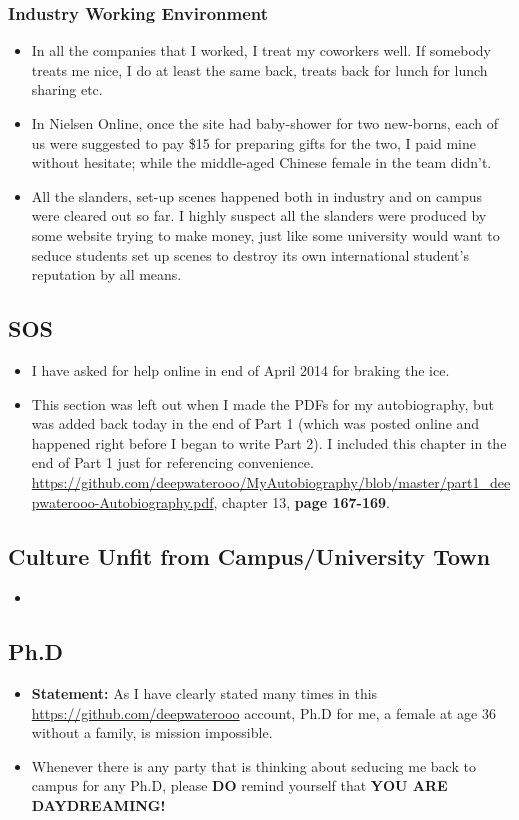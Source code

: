 \documentclass[9pt,b5paper]{article}
\begin{document}
\subsubsection{Industry Working Environment}
\label{sec-12-1-3}
\begin{itemize}
\item In all the companies that I worked, I treat my coworkers well. If somebody treats me nice, I do at least the same back, treats back for lunch for lunch sharing etc.
\item In Nielsen Online, once the site had baby-shower for two new-borns, each of us were suggested to pay \$15 for preparing gifts for the two, I paid mine without hesitate; while the middle-aged Chinese female in the team didn't.
\item All the slanders, set-up scenes happened both in industry and on campus were cleared out so far. I highly suspect all the slanders were produced by some website trying to make money, just like some university would want to seduce students set up scenes to destroy its own international student's reputation by all means.
\end{itemize}
\subsection{SOS}
\label{sec-12-2}
\begin{itemize}
\item I have asked for help online in end of April 2014 for braking the ice.
\item This section was left out when I made the PDFs for my autobiography, but was added back today in the end of Part 1 (which was posted online and happened right before I began to write Part 2). I included this chapter in the end of Part 1 just for referencing convenience. \url{https://github.com/deepwaterooo/MyAutobiography/blob/master/part1_deepwaterooo-Autobiography.pdf}, chapter 13, \textbf{page 167-169}.
\end{itemize}
\subsection{Culture Unfit from Campus/University Town}
\label{sec-12-3}
\begin{itemize}
\item 
\end{itemize}
\subsection{Ph.D}
\label{sec-12-4}
\begin{itemize}
\item \textbf{Statement:} As I have clearly stated many times in this \url{https://github.com/deepwaterooo} account, Ph.D for me, a female at age 36 without a family, is mission impossible.
\item Whenever there is any party that is thinking about seducing me back to campus for any Ph.D, please \textbf{DO} remind yourself that \textbf{YOU ARE DAYDREAMING!}
\end{itemize}
\end{document}
